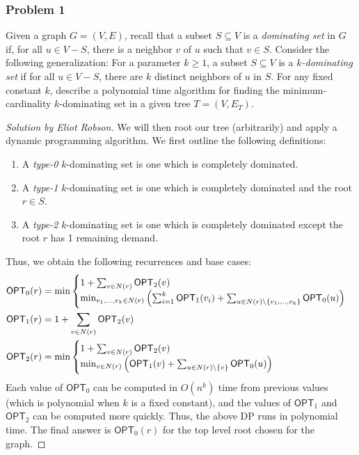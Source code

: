 \documentclass{article}
\newenvironment{solution}[1]{\begin{proof}[Solution by #1]}{\end{proof}}
\newcommand{\OPT}{\mathsf{OPT}}
\begin{document}
\subsubsection{Problem 1}
Given a graph \(G = (V,E)\), recall that a subset \(S \subseteq V\) is a \emph{dominating set} in \(G\) if, for all \(u \in V - S\), there is a neighbor \(v\) of \(u\) such that \(v \in S\). Consider the following generalization: For a parameter \(k \geq 1\), a subset \(S \subseteq V\) is a \emph{\(k\)-dominating set} if for all \(u \in V - S\), there are \(k\) distinct neighbors of \(u\) in \(S\). For any fixed constant \(k\), describe a polynomial time algorithm for finding the minimum-cardinality \(k\)-dominating set in a given tree \(T = (V, E_T)\).

\begin{solution}{Eliot Robson}
    We will then root our tree (arbitrarily) and apply a dynamic programming algorithm. We first outline the following definitions:
    \begin{enumerate}
        \item A \emph{type-0} \(k\)-dominating set is one which is completely dominated.
        \item A \emph{type-1} \(k\)-dominating set is one which is completely dominated and the root \(r \in S\).
        \item A \emph{type-2} \(k\)-dominating set is one which is completely dominated except the root \(r\) has 1 remaining demand.
    \end{enumerate}
	Thus, we obtain the following recurrences and base cases:
	\begin{align*}
		\OPT_0 (r)
        &=%
        \min
        \begin{cases}
            1 + \sum_{v \in N(r)} \OPT_2(v)\\
            \min_{v_1, \dots, v_k \in N(r)} \del{\sum_{i=1}^{k} \OPT_1 (v_i) + \sum_{u \in N(r) \setminus \set{v_1, \dots, v_k}} \OPT_0 (u) }
        \end{cases}\\
        \OPT_1 (r)
        &=%
        1 + \sum_{v \in N(r)} \OPT_2 (v)\\
        \OPT_2 (r)
        &=%
        \min
        \begin{cases}
            1 + \sum_{v \in N(r)} \OPT_2 (v)\\
            \min_{v \in N(r)}
            \del{\OPT_1 (v) + \sum_{u \in N(r) \setminus \set{v}} \OPT_0 (u) }
        \end{cases} 
	\end{align*}
    Each value of \(\OPT_0\) can be computed in \(O(n^k)\) time from previous values (which is polynomial when \(k\) is a fixed constant), and the values of \(\OPT_1\) and \(\OPT_2\) can be computed more quickly. Thus, the above DP runs in polynomial time. The final answer is \(\OPT_0(r)\) for the top level root chosen for the graph.
\end{solution}
\end{document}
